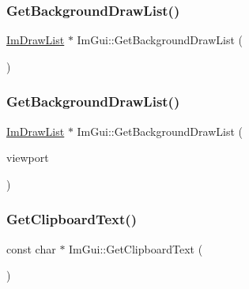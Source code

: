 \mbox{\label{namespaceImGui_ab361971e8b198a11c6ece6b49cf03647}} 
\subsubsection{\texorpdfstring{Get\+Background\+Draw\+List()}{GetBackgroundDrawList()}\hspace{0.1cm}{\footnotesize\ttfamily [1/2]}}
{\footnotesize\ttfamily \hyperlink{structImDrawList}{Im\+Draw\+List} $\ast$ Im\+Gui\+::\+Get\+Background\+Draw\+List (\begin{DoxyParamCaption}{ }\end{DoxyParamCaption})}

\mbox{\label{namespaceImGui_ab9cfddd372e40f8cb35806d8ee2a23dc}} 
\subsubsection{\texorpdfstring{Get\+Background\+Draw\+List()}{GetBackgroundDrawList()}\hspace{0.1cm}{\footnotesize\ttfamily [2/2]}}
{\footnotesize\ttfamily \hyperlink{structImDrawList}{Im\+Draw\+List} $\ast$ Im\+Gui\+::\+Get\+Background\+Draw\+List (\begin{DoxyParamCaption}\item[{\hyperlink{structImGuiViewport}{Im\+Gui\+Viewport} $\ast$}]{viewport }\end{DoxyParamCaption})}

\mbox{\label{namespaceImGui_a11837daee819fd90e17d80ab1eef1f99}} 
\subsubsection{\texorpdfstring{Get\+Clipboard\+Text()}{GetClipboardText()}}
{\footnotesize\ttfamily const char $\ast$ Im\+Gui\+::\+Get\+Clipboard\+Text (\begin{DoxyParamCaption}{ }\end{DoxyParamCaption})}


